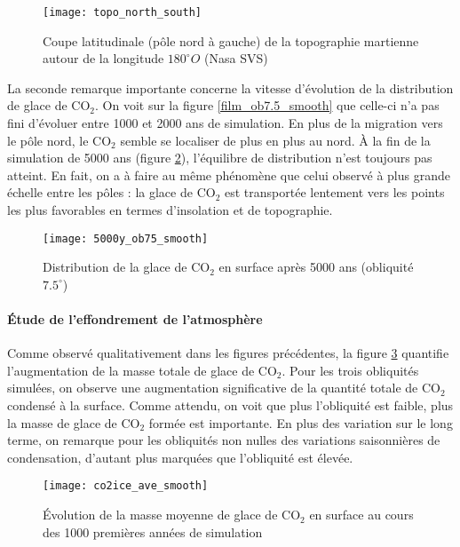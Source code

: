 \documentclass[11pt,a4paper]{article}
\begin{document}
\begin{figure}[h!]
\begin{center}
\texttt{[image: topo\_north\_south]}
\caption{Coupe latitudinale (pôle nord à gauche) de la topographie martienne autour de la longitude $180^\circ O$ (Nasa SVS)}
\label{topo_north_south}
\end{center}
\end{figure}

La seconde remarque importante concerne la vitesse d'évolution de la distribution de glace de CO$_2$. On voit sur la figure \ref{film_ob7.5_smooth} que celle-ci n'a pas fini d'évoluer entre 1000 et 2000 ans de simulation. En plus de la migration vers le pôle nord, le CO$_2$ semble se localiser de plus en plus au nord. À la fin de la simulation de 5000 ans (figure \ref{5000y_ob7.5_smooth}), l'équilibre de distribution n'est toujours pas atteint. En fait, on a à faire au même phénomène que celui observé à plus grande échelle entre les pôles : la glace de CO$_2$ est transportée lentement vers les points les plus favorables en termes d'insolation et de topographie. \\

\begin{figure}[h!]
\begin{center}
\texttt{[image: 5000y\_ob75\_smooth]}
\caption{Distribution de la glace de CO$_2$ en surface après 5000 ans (obliquité $7.5^\circ$)}
\label{5000y_ob7.5_smooth}
\end{center}
\end{figure}


\paragraph{\' Etude de l'effondrement de l'atmosphère \\}
Comme observé qualitativement dans les figures précédentes, la figure \ref{co2ice_ave_smooth} quantifie l'augmentation de la masse totale de glace de CO$_2$. Pour les trois obliquités simulées, on observe une augmentation significative de la quantité totale de CO$_2$ condensé à la surface. Comme attendu, on voit que plus l'obliquité est faible, plus la masse de glace de CO$_2$ formée est importante. En plus des variation sur le long terme, on remarque pour les obliquités non nulles des variations saisonnières de condensation, d'autant plus marquées que l'obliquité est élevée. \\

\begin{figure}[h!]
\begin{center}
\texttt{[image: co2ice\_ave\_smooth]}
\caption{\' Evolution de la masse moyenne de glace de CO$_2$ en surface au cours des 1000 premières années de simulation}
\label{co2ice_ave_smooth}
\end{center}
\end{figure}
\end{document}

